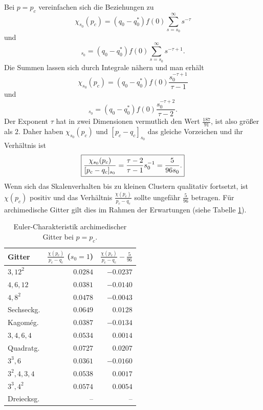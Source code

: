 Bei $p=p_c$ vereinfachen sich die Beziehungen zu 
\begin{equation}
   \chi_{s_0}(p_c)=(q_0-q_0^*)f(0)\sum_{s={s_0}}^{\infty}s^{-\tau}
\end{equation}
und 
\begin{equation}
   [p_c-q_c]_{s_0}=(q_0-q_0^*)f(0)\sum_{s=s_0}^{\infty}s^{-\tau+1}.
\end{equation}
Die Summen lassen sich durch Integrale n\"ahern und man erh\"alt
\begin{equation}
   \chi_{s_0}(p_c)=(q_0-q_0^*)f(0)\frac{s_0^{-\tau+1}}{\tau-1}
\end{equation}
und
\begin{equation}
   [p_c-q_c]_{s_0}=(q_0-q_0^*)f(0)\frac{s_0^{-\tau+2}}{\tau-2}.
\end{equation}
Der Exponent $\tau$ hat in zwei Dimensionen vermutlich den Wert $\frac{187}{91}$, ist also gr\"o\ss er als $2$. Daher haben $\chi_{s_0}(p_c)$ und $[p_c-q_c]_{s_0}$ das gleiche Vorzeichen und ihr Verh\"altnis ist
\begin{equation}
   \fbox{$\displaystyle \frac{\chi_{s_0}(p_c)}{[p_c-q_c]_{s_0}}=\frac{\tau-2}{\tau-1}s_0^{-1}=\frac{5}{96s_0}.$}
\end{equation}
Wenn sich das Skalenverhalten bis zu kleinen Clustern qualitativ fortsetzt, ist $\chi(p_c)$ positiv und das Verh\"altnis $\frac{\chi(p_c)}{p_c-q_c}$ sollte ungef\"ahr $\frac{5}{96}$ betragen. F\"ur archimedische Gitter gilt dies im Rahmen der Erwartungen (siehe Tabelle \ref{tab:archiscale}).
\begin{table}
\centering
\begin{tabular}{|l|r|r|}
\hline
Gitter &$\frac{\chi(p_c)}{p_c-q_c}$ ($s_0=1$) &$\frac{\chi(p_c)}{p_c-q_c}-\frac{5}{96}$ \\
\hline
$3,12^2$ & $ 0.0284$&$-0.0237$\\
$4,6,12$ & $ 0.0381$&$-0.0140$\\
$4,8^2$ &$0.0478$&$-0.0043$\\
Sechseckg.&$0.0649$&$0.0128$ \\
Kagom\'eg. &$0.0387$&$-0.0134$\\
$3,4,6,4$&$ 0.0534$&$0.0014$ \\
Quadratg. &$0.0727$&$0.0207$\\
$3^3,6$ &$0.0361$&$-0.0160$\\
$3^2,4,3,4$ &$ 0.0538$&$0.0017$\\
$3^3,4^2$ &$0.0574$ &$0.0054$\\
Dreiecksg. &-- &--\\\hline
\end{tabular}
\caption{Euler-Charakteristik archimedischer Gitter bei $p=p_c$.}
\label{tab:archiscale}
\end{table}
